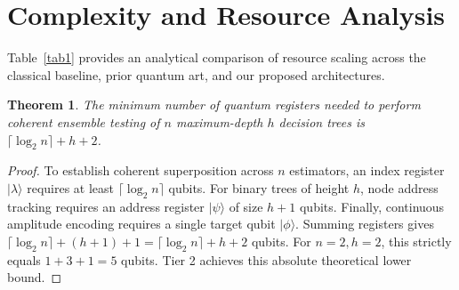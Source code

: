 \documentclass[conference]{IEEEtran}
\newtheorem{theorem}{Theorem}
\begin{document}
\begin{table}[!t]
\caption{Complexity and Circuit Resource Comparison}
\label{tab1}
\centering
{}
\end{table}

\section{Complexity and Resource Analysis}\label{sec5}

Table~\ref{tab1} provides an analytical comparison of resource scaling across the classical baseline, prior quantum art, and our proposed architectures.

\begin{theorem}\label{thm1}
The minimum number of quantum registers needed to perform coherent ensemble testing of $n$ maximum-depth $h$ decision trees is $\lceil \log_2 n \rceil + h + 2$.
\end{theorem}

\begin{proof}
To establish coherent superposition across $n$ estimators, an index register $|\lambda\rangle$ requires at least $\lceil \log_2 n \rceil$ qubits. For binary trees of height $h$, node address tracking requires an address register $|\psi\rangle$ of size $h + 1$ qubits. Finally, continuous amplitude encoding requires a single target qubit $|\phi\rangle$. Summing registers gives $\lceil \log_2 n \rceil + (h + 1) + 1 = \lceil \log_2 n \rceil + h + 2$ qubits. For $n = 2, h = 2$, this strictly equals $1 + 3 + 1 = 5$ qubits. Tier 2 achieves this absolute theoretical lower bound.
\end{proof}
\end{document}
